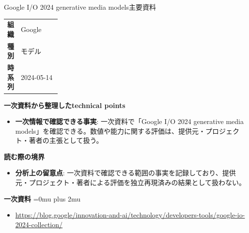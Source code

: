 \begin{technicalnote}{Google I/O 2024 generative media models}{主要資料}
\begingroup
\begin{tabularx}{\linewidth}{@{}>{\bfseries}p{0.22\linewidth}X@{}}
組織 & Google \\
種別 & モデル \\
時系列 & 2024-05-14 \\
\end{tabularx}
\smallskip
{\bfseries 一次資料から整理したtechnical points}
\begin{itemize}[leftmargin=1.5em,itemsep=0.35em]
\item \textbf{一次情報で確認できる事実}: 一次資料で「Google I/O 2024 generative media models」を確認できる。数値や能力に関する評価は、提供元・プロジェクト・著者の主張として扱う。
\end{itemize}
\begin{minipage}{\linewidth}
{\bfseries 読む際の境界}
\begin{itemize}[leftmargin=1.5em,itemsep=0.35em]
\item \textbf{分析上の留意点}: 一次資料で確認できる範囲の事実を記録しており、提供元・プロジェクト・著者による評価を独立再現済みの結果として扱わない。
\end{itemize}
\begin{samepage}
{\bfseries 一次資料}
\begingroup\sloppy
\Urlmuskip=0mu plus 2mu\relax
\begin{itemize}[leftmargin=1.5em,itemsep=0.25em]
\item {\scriptsize\url{https://blog.google/innovation-and-ai/technology/developers-tools/google-io-2024-collection/}}
\end{itemize}
\endgroup
\end{samepage}
\end{minipage}
\endgroup
\end{technicalnote}
\medskip

